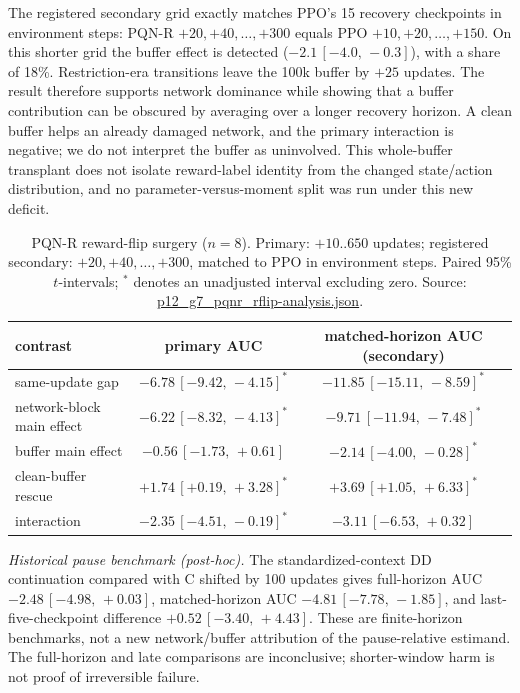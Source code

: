 \documentclass[10pt]{article} %
\newcommand{\sig}{^{\ast}}
\newcommand{\ci}[2]{\,[#1,\,#2]}
\begin{document}
The registered secondary grid exactly matches PPO's 15 recovery checkpoints in environment steps: PQN-R $+20,+40,\ldots,+300$ equals PPO $+10,+20,\ldots,+150$. On this shorter grid the buffer effect is detected ($-2.1\ci{-4.0}{-0.3}$), with a share of 18\%. Restriction-era transitions leave the 100k buffer by $+25$ updates. The result therefore supports network dominance while showing that a buffer contribution can be obscured by averaging over a longer recovery horizon. A clean buffer helps an already damaged network, and the primary interaction is negative; we do not interpret the buffer as uninvolved. This whole-buffer transplant does not isolate reward-label identity from the changed state/action distribution, and no parameter-versus-moment split was run under this new deficit.

\begin{table}[t]
\centering
\caption{PQN-R reward-flip surgery ($n=8$). Primary: $+10..650$ updates; registered secondary: $+20,+40,\ldots,+300$, matched to PPO in environment steps. Paired 95\% $t$-intervals; $\sig$ denotes an unadjusted interval excluding zero. Source: \url{p12_g7_pqnr_rflip-analysis.json}.}
\label{tab:p12pqnr}
\small
\begin{tabular}{lcc}
\toprule
contrast & primary AUC & matched-horizon AUC (secondary) \\
\midrule
same-update gap & $-6.78\ci{-9.42}{-4.15}\sig$ & $-11.85\ci{-15.11}{-8.59}\sig$ \\
network-block main effect & $-6.22\ci{-8.32}{-4.13}\sig$ & $-9.71\ci{-11.94}{-7.48}\sig$ \\
buffer main effect & $-0.56\ci{-1.73}{+0.61}$ & $-2.14\ci{-4.00}{-0.28}\sig$ \\
clean-buffer rescue & $+1.74\ci{+0.19}{+3.28}\sig$ & $+3.69\ci{+1.05}{+6.33}\sig$ \\
interaction & $-2.35\ci{-4.51}{-0.19}\sig$ & $-3.11\ci{-6.53}{+0.32}$ \\
\bottomrule
\end{tabular}
\end{table}

\emph{Historical pause benchmark (post-hoc).} The standardized-context DD continuation compared with C shifted by 100 updates gives full-horizon AUC $-2.48\ci{-4.98}{+0.03}$, matched-horizon AUC $-4.81\ci{-7.78}{-1.85}$, and last-five-checkpoint difference $+0.52\ci{-3.40}{+4.43}$. These are finite-horizon benchmarks, not a new network/buffer attribution of the pause-relative estimand. The full-horizon and late comparisons are inconclusive; shorter-window harm is not proof of irreversible failure.
\end{document}
